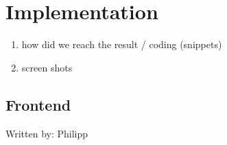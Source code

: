 \section{Implementation}
\begin{enumerate}
    \item how did we reach the result / coding (snippets)
    \item screen shots
\end{enumerate}

\subsection{Frontend}
{\tiny Written by: Philipp}